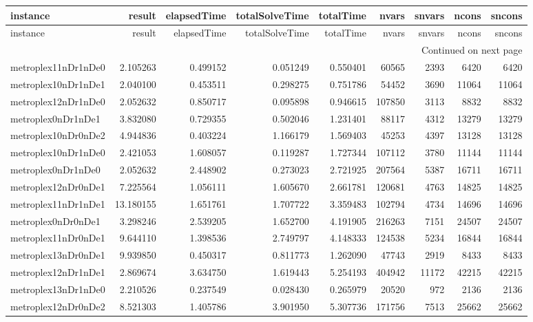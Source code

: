 
\begin{longtable}{|l|r|r|r|r|r|r|r|r|}
\toprule
instance & result & elapsedTime & totalSolveTime & totalTime & nvars & snvars & ncons & sncons \\
\midrule
\endfirsthead
\toprule
instance & result & elapsedTime & totalSolveTime & totalTime & nvars & snvars & ncons & sncons \\
\midrule
\endhead
\midrule
\multicolumn{9}{r}{Continued on next page} \\
\midrule
\endfoot
\bottomrule
\endlastfoot
metroplex11nDr1nDe0 & 2.105263 & 0.499152 & 0.051249 & 0.550401 & 60565 & 2393 & 6420 & 6420 \\
metroplex10nDr1nDe1 & 2.040100 & 0.453511 & 0.298275 & 0.751786 & 54452 & 3690 & 11064 & 11064 \\
metroplex12nDr1nDe0 & 2.052632 & 0.850717 & 0.095898 & 0.946615 & 107850 & 3113 & 8832 & 8832 \\
metroplex0nDr1nDe1 & 3.832080 & 0.729355 & 0.502046 & 1.231401 & 88117 & 4312 & 13279 & 13279 \\
metroplex10nDr0nDe2 & 4.944836 & 0.403224 & 1.166179 & 1.569403 & 45253 & 4397 & 13128 & 13128 \\
metroplex10nDr1nDe0 & 2.421053 & 1.608057 & 0.119287 & 1.727344 & 107112 & 3780 & 11144 & 11144 \\
metroplex0nDr1nDe0 & 2.052632 & 2.448902 & 0.273023 & 2.721925 & 207564 & 5387 & 16711 & 16711 \\
metroplex12nDr0nDe1 & 7.225564 & 1.056111 & 1.605670 & 2.661781 & 120681 & 4763 & 14825 & 14825 \\
metroplex11nDr1nDe1 & 13.180155 & 1.651761 & 1.707722 & 3.359483 & 102794 & 4734 & 14696 & 14696 \\
metroplex0nDr0nDe1 & 3.298246 & 2.539205 & 1.652700 & 4.191905 & 216263 & 7151 & 24507 & 24507 \\
metroplex11nDr0nDe1 & 9.644110 & 1.398536 & 2.749797 & 4.148333 & 124538 & 5234 & 16844 & 16844 \\
metroplex13nDr0nDe1 & 9.939850 & 0.450317 & 0.811773 & 1.262090 & 47743 & 2919 & 8433 & 8433 \\
metroplex12nDr1nDe1 & 2.869674 & 3.634750 & 1.619443 & 5.254193 & 404942 & 11172 & 42215 & 42215 \\
metroplex13nDr1nDe0 & 2.210526 & 0.237549 & 0.028430 & 0.265979 & 20520 & 972 & 2136 & 2136 \\
metroplex12nDr0nDe2 & 8.521303 & 1.405786 & 3.901950 & 5.307736 & 171756 & 7513 & 25662 & 25662 \\

\end{longtable}
